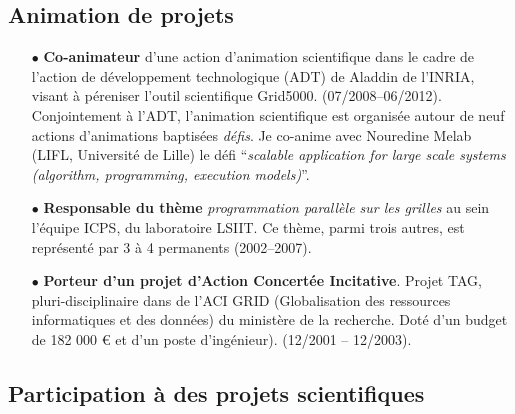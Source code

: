 \subsection{Animation de projets}
\begin{itemize}
\item[$\bullet$]
\textbf{Co-animateur} d'une action d'animation scientifique 
dans le cadre de l'action de développement technologique (ADT) de Aladdin de l'INRIA, 
visant à péreniser l'outil scientifique Grid5000. (07/2008--06/2012). 
Conjointement à l'ADT, l'animation scientifique est organisée autour de neuf actions d'animations baptisées \emph{défis}.
Je co-anime avec Nouredine Melab (LIFL, Université de Lille) le défi 
``{\em scalable application for large scale systems (algorithm, programming, execution models)}''.\\

\item[$\bullet$]
\textbf{Responsable du thème} \emph{programmation parallèle sur les grilles} au sein l'équipe ICPS,
du laboratoire LSIIT. Ce thème, parmi trois autres, est représenté par 3 à 4 permanents (2002--2007).\\


\item[$\bullet$]
\textbf{Porteur d'un projet d'Action Concertée Incitative}. Projet TAG, 
pluri-disciplinaire dans de l'ACI GRID (Globalisation des ressources informatiques et des données) 
du ministère de la recherche. Doté d'un budget de 182 000 \euro{} et d'un poste d'ingénieur). 
(12/2001 -- 12/2003).\\

\end{itemize}


\subsection{Participation à des projets scientifiques}

